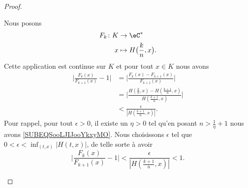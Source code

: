 \begin{proof}
\begin{subproof}
		Nous posons
		\begin{equation}
			\begin{aligned}
				F_k\colon K & \to \eC^*                               \\
				x           & \mapsto H\big( \frac{ k }{ n },x \big).
			\end{aligned}
		\end{equation}
		Cette application est continue sur \( K\) et pour tout \( x\in K\) nous avons
		\begin{subequations}        \label{SUBEQSooLJIJooYkxyMO}
			\begin{align}
				\big| \frac{ F_k(x) }{ F_{k+1}(x) }-1 \big| & =\big| \frac{ F_k(x)-F_{k+1}(x) }{ F_{k+1}(x) } \big|                                       \\
				                                            & =\big| \frac{ H(\frac{ k }{ n },x)-H(\frac{ k+1 }{ n },x) }{ H(\frac{ k+1 }{ n },x) } \big| \\
				                                            & <\frac{ \epsilon }{ | H(\frac{ k+1 }{ n },x) | }.
			\end{align}
		\end{subequations}
		Pour rappel, pour tout \( \epsilon>0\), il existe un \( \eta>0\) tel qu'en posant \( n>\frac{1}{ \eta }+1\) nous avons \eqref{SUBEQSooLJIJooYkxyMO}. Nous choisissons \( \epsilon\) tel que \( 0<\epsilon<\inf_{(t,x)}| H(t,x) |\), de telle sorte à avoir
		\begin{equation}
			\big| \frac{ F_k(x) }{ F_{k+1}(x) }-1 \big|<\frac{ \epsilon }{ | H(\frac{ k+1 }{ n },x) | }<1.
		\end{equation}


\end{subproof}
\end{proof}
